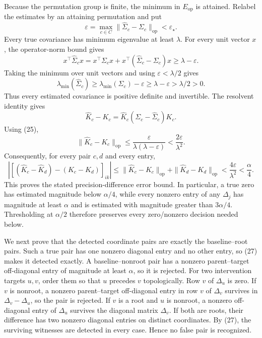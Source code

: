 Because the permutation group is finite, the minimum in \(E_{\mathrm{op}}\)
is attained.  Relabel the estimates by an attaining permutation and put
\[
 \varepsilon=\max_{c\in C}
 \|\widehat\Sigma_c-\Sigma_c\|_{\mathrm{op}}
 <\varepsilon_\star .
\]
Every true covariance has minimum eigenvalue at least \(\lambda\).  For
every unit vector \(x\), the operator-norm bound gives
\[
 x^{\top}\widehat\Sigma_cx
 =x^{\top}\Sigma_cx+
   x^{\top}(\widehat\Sigma_c-\Sigma_c)x
 \ge\lambda-\varepsilon.
\]
Taking the minimum over unit vectors and using
\(\varepsilon<\lambda/2\) gives
\[
 \lambda_{\min}(\widehat\Sigma_c)
 \ge\lambda_{\min}(\Sigma_c)-\varepsilon
 \ge\lambda-\varepsilon>\lambda/2>0.                               \tag{25}
\]
Thus every estimated covariance is positive definite and invertible.
The resolvent identity gives
\[
 \widehat K_c-K_c
 =\widehat K_c(\Sigma_c-\widehat\Sigma_c)K_c.
\]
Using (25),
\[
 \|\widehat K_c-K_c\|_{\mathrm{op}}
 \le\frac{\varepsilon}{\lambda(\lambda-\varepsilon)}
 <\frac{2\varepsilon}{\lambda^2}.                                 \tag{26}
\]
Consequently, for every pair \(c,d\) and every entry,
\[
 \left|
 [(\widehat K_c-\widehat K_d)-(K_c-K_d)]_{ik}
 \right|
 \le\|\widehat K_c-K_c\|_{\mathrm{op}}
    +\|\widehat K_d-K_d\|_{\mathrm{op}}
 <\frac{4\varepsilon}{\lambda^2}
 <\frac{\alpha}{4}.                                                \tag{27}
\]
This proves the stated precision-difference error bound.  In particular,
a true zero has estimated magnitude below \(\alpha/4\), while every
nonzero entry of any \(\Delta_j\) has magnitude at least \(\alpha\) and
is estimated with magnitude greater than \(3\alpha/4\).  Thresholding at
\(\alpha/2\) therefore preserves every zero/nonzero decision needed below.

We next prove that the detected coordinate pairs are exactly the
baseline--root pairs.  Such a true pair has one nonzero diagonal entry
and no other entry, so (27) makes it detected exactly.  A
baseline--nonroot pair has a nonzero parent--target off-diagonal entry of
magnitude at least \(\alpha\), so it is rejected.  For two intervention
targets \(u,v\), order them so that \(u\) precedes \(v\) topologically.
Row \(v\) of \(\Delta_u\) is zero.  If \(v\) is nonroot, a nonzero
parent--target off-diagonal entry in row \(v\) of \(\Delta_v\) survives in
\(\Delta_v-\Delta_u\), so the pair is rejected.  If \(v\) is a root and
\(u\) is nonroot, a nonzero off-diagonal entry of \(\Delta_u\) survives
the diagonal matrix \(\Delta_v\).  If both are roots, their difference
has two nonzero diagonal entries on distinct coordinates.  By (27), the
surviving witnesses are detected in every case.  Hence no false pair is
recognized.

